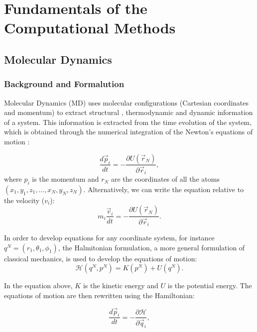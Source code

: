
\chapter{Fundamentals of the Computational Methods} %

\label{Chapter3} %

\section{Molecular Dynamics}

\subsection{Background and Formalution}
Molecular Dynamics (MD) uses molecular configurations (Cartesian coordinates and momentum) to extract structural , thermodynamic and dynamic information of a system. This information is extracted from the time evolution of the system, which is obtained  through the numerical integration of the Newton's equations of motion \cite{tuckerman}:

\begin{equation}
\frac{d \vec{p}_{i}}{dt} = - \frac{\partial U (\vec{r}_{N})}{\partial \vec{r}_{i}},
\end{equation}
where $p_{i}$ is the momentum and $r_{N}$ are the coordinates of all the atoms$(x_{1},y_{1},z_{1},...,x_{N},y_{N},z_{N})$. Alternatively, we can write the equation relative to the velocity ($v_{i}$):
\begin{equation}
m_{i} \frac{\vec{v}_{i}}{dt} = - \frac{\partial U (\vec{r}_{N})}{\partial \vec{r}_{i}}.
\end{equation}

In order to develop equations for any coordinate system, for instance $q^{N}=(r_{1},\theta _{1},\phi _{1})$, the Halmitonian formulation, a more general formulation of classical mechanics,  is used to develop the equations of motion:
\begin{equation}
\mathcal{H} (q^{N},p^{N}) = K(p^{N}) + U(q^{N}) .
\end{equation}

In the equation above, $K$ is the kinetic energy and $U$ is the potential energy. The equations of motion are then rewritten using the Hamiltonian:

\begin{equation}
\frac{d \vec{p}_{i}}{dt} = - \frac{\partial \mathcal{H}}{\partial \vec{q}_{i}},
\end{equation}

